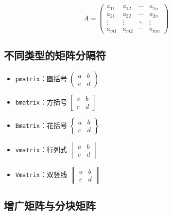 \begin{equation}
    A = \begin{pmatrix}
        a_{11} & a_{12} & \cdots & a_{1n} \\
        a_{21} & a_{22} & \cdots & a_{2n} \\
        \vdots & \vdots & \ddots & \vdots \\
        a_{m1} & a_{m2} & \cdots & a_{mn}
    \end{pmatrix}
    \label{eq:matrix-basic}
\end{equation}

\subsection{不同类型的矩阵分隔符}

\begin{itemize}
    \item \texttt{pmatrix}：圆括号 $\begin{pmatrix} a & b \\ c & d \end{pmatrix}$
    \item \texttt{bmatrix}：方括号 $\begin{bmatrix} a & b \\ c & d \end{bmatrix}$
    \item \texttt{Bmatrix}：花括号 $\begin{Bmatrix} a & b \\ c & d \end{Bmatrix}$
    \item \texttt{vmatrix}：行列式 $\begin{vmatrix} a & b \\ c & d \end{vmatrix}$
    \item \texttt{Vmatrix}：双竖线 $\begin{Vmatrix} a & b \\ c & d \end{Vmatrix}$
\end{itemize}


\subsection{增广矩阵与分块矩阵}

